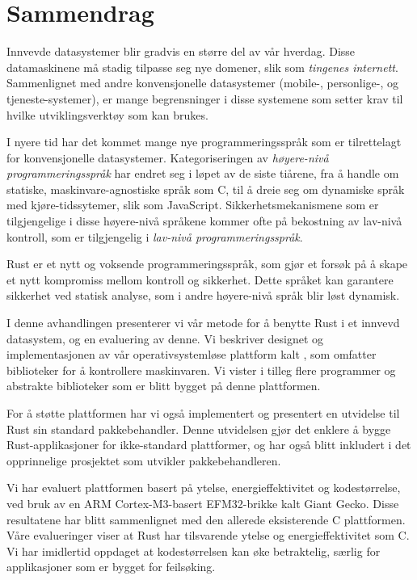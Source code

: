 
\chapter{Sammendrag}
\label{chap:sammendrag}

Innvevde datasystemer blir gradvis en større del av vår hverdag.
Disse datamaskinene må stadig tilpasse seg nye domener, slik som \emph{tingenes internett}.
Sammenlignet med andre konvensjonelle datasystemer (mobile-, personlige-, og tjeneste-systemer), er mange begrensninger i disse systemene som setter krav til hvilke utviklingsverktøy som kan brukes.

I nyere tid har det kommet mange nye programmeringsspråk som er tilrettelagt for konvensjonelle datasystemer.
Kategoriseringen av \emph{høyere-nivå programmeringsspråk} har endret seg i løpet av de siste tiårene, fra å handle om statiske, maskinvare-agnostiske språk som C, til å dreie seg om dynamiske språk med kjøre-tidssytemer, slik som JavaScript.
Sikkerhetsmekanismene som er tilgjengelige i disse høyere-nivå språkene kommer ofte på bekostning av lav-nivå kontroll, som er tilgjengelig i \emph{lav-nivå programmeringsspråk}.

Rust er et nytt og voksende programmeringsspråk, som gjør et forsøk på å skape et nytt kompromiss mellom kontroll og sikkerhet.
Dette språket kan garantere sikkerhet ved statisk analyse, som i andre høyere-nivå språk blir løst dynamisk.

I denne avhandlingen presenterer vi vår metode for å benytte Rust i et innvevd datasystem, og en evaluering av denne.
Vi beskriver designet og implementasjonen av vår operativsystemløse plattform kalt {\rg}, som omfatter biblioteker for å kontrollere maskinvaren.
Vi vister i tilleg flere programmer og abstrakte biblioteker som er blitt bygget på denne plattformen.

For å støtte plattformen har vi også implementert og presentert en utvidelse til Rust sin standard pakkebehandler.
Denne utvidelsen gjør det enklere å bygge Rust-applikasjoner for ikke-standard plattformer, og har også blitt inkludert i det opprinnelige prosjektet som utvikler pakkebehandleren.

Vi har evaluert plattformen basert på ytelse, energieffektivitet og kodestørrelse, ved bruk av en ARM Cortex-M3-basert EFM32-brikke kalt Giant Gecko.
Disse resultatene har blitt sammenlignet med den allerede eksisterende C plattformen.
Våre evalueringer viser at Rust har tilsvarende ytelse og energieffektivitet som C.
Vi har imidlertid oppdaget at kodestørrelsen kan øke betraktelig, særlig for applikasjoner som er bygget for feilsøking.
